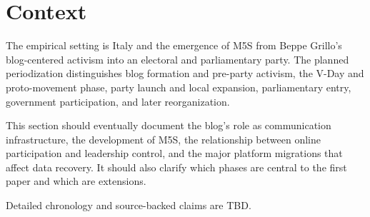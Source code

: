 \section{Context}\label{sec:context}

The empirical setting is Italy and the emergence of M5S from Beppe Grillo's blog-centered activism into an electoral and parliamentary party. The planned periodization distinguishes blog formation and pre-party activism, the V-Day and proto-movement phase, party launch and local expansion, parliamentary entry, government participation, and later reorganization.

This section should eventually document the blog's role as communication infrastructure, the development of M5S, the relationship between online participation and leadership control, and the major platform migrations that affect data recovery. It should also clarify which phases are central to the first paper and which are extensions.

Detailed chronology and source-backed claims are TBD.
